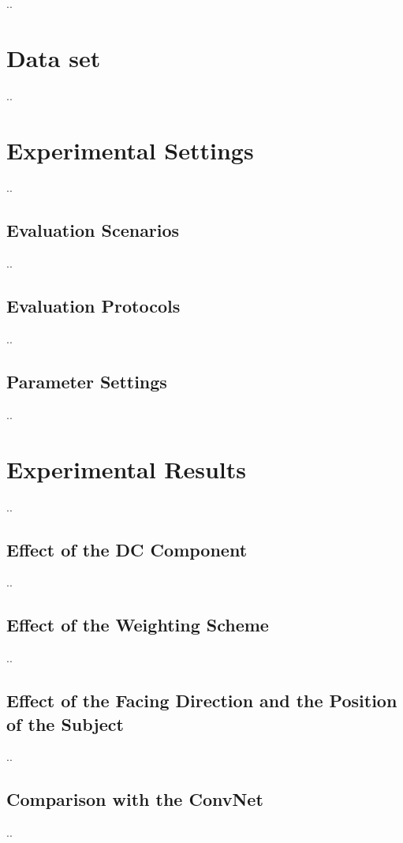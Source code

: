 \label{chp:Experiments}
..
\section{Data set}
\label{sec:Dataset}
..
\section{Experimental Settings}
..
\subsection{Evaluation Scenarios}
\label{sec:scenario}
..
\subsection{Evaluation Protocols}
\label{sec:protocols}
..
\subsection{Parameter Settings}
\label{sec:parameter}
..
\section{Experimental Results}
\label{sec:results}
..
\subsection{Effect of the DC Component}
\label{sec:DC}
..
\subsection{Effect of the Weighting Scheme}
..
\subsection{Effect of the Facing Direction and the Position of the Subject}
..
\subsection{Comparison with the ConvNet}
..